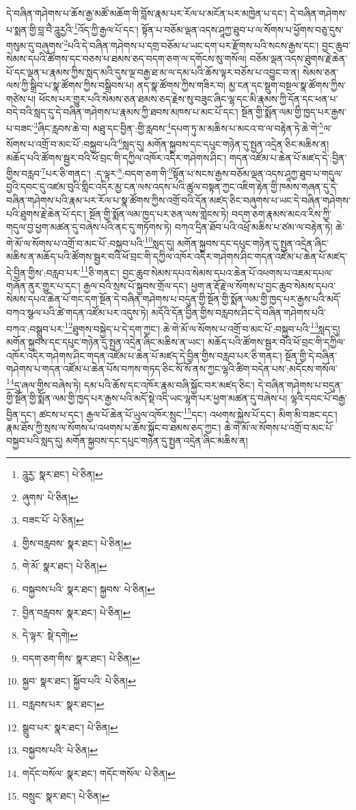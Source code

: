 དེ་བཞིན་གཤེགས་པ་ཆོས་རྒྱ་མཚོ་མཆོག་གི་བློས་རྣམ་པར་རོལ་པ་མངོན་པར་མཁྱེན་པ་དང་། དེ་བཞིན་གཤེགས་པ་སྨན་གྱི་བླ་བཻ་ཌཱུརྱའི་\footnote{ཌཱུརྱ་  སྣར་ཐང་།  པེ་ཅིན། }འོད་ཀྱི་རྒྱལ་པོ་དང་། སྟོན་པ་བཅོམ་ལྡན་འདས་ཤཱཀྱ་ཐུབ་པ་ལ་སོགས་པ་ཕྱོགས་བཅུ་དུས་གསུམ་དུ་བཞུགས་\footnote{ཞུགས་  པེ་ཅིན། }པའི་དེ་བཞིན་གཤེགས་པ་དགྲ་བཅོམ་པ་ཡང་དག་པར་རྫོགས་པའི་སངས་རྒྱས་དང་། བྱང་ཆུབ་སེམས་དཔའི་ཚོགས་དང་བཅས་པ་ཐམས་ཅད་བདག་ཅག་ལ་དགོངས་སུ་གསོལ། བཅོམ་ལྡན་འདས་ཐུགས་རྗེ་ཆེན་པོ་དང་ལྡན་པ་རྣམས་ཀྱིས་སླད་མའི་དུས་ལྔ་བརྒྱ་ཐ་མ་ལ་དམ་པའི་ཆོས་ལྟར་བཅོས་པ་འབྱུང་བ་ན། སེམས་ཅན་ལས་ཀྱི་སྒྲིབ་པ་སྣ་ཚོགས་ཀྱིས་བསྒྲིབས་པ། ནད་སྣ་ཚོགས་ཀྱིས་གཟིར་བ། མྱ་ངན་དང་སྡུག་བསྔལ་སྣ་ཚོགས་ཀྱིས་གཙེས་པ། ཕོངས་པར་གྱུར་པའི་སེམས་ཅན་ཐམས་ཅད་རྗེས་སུ་བཟུང་ཞིང་ལྷ་དང་མི་རྣམས་ཀྱི་དོན་དང་ཕན་པ་བདེ་བའི་སླད་དུ་དེ་བཞིན་གཤེགས་པ་རྣམས་ཀྱི་ཐབས་མཁས་པ་མང་པོ་དང་། སྔོན་གྱི་སྨོན་ལམ་གྱི་ཁྱད་པར་རྒྱས་པ་བཟང་\footnote{བཟང་པོ་  པེ་ཅིན། }ཞིང་རླབས་ཆེ་བ། མཐུ་དང་བྱིན་:གྱི་རླབས་\footnote{གྱིས་བརླབས་  སྣར་ཐང་།  པེ་ཅིན། }དཔག་ཏུ་མ་མཆིས་པ་མངའ་བ་ལ་བརྟེན་ཏེ་ཆེ་གེ་\footnote{གེ་མོ་  སྣར་ཐང་།  པེ་ཅིན། }ལ་སོགས་པ་འགྲོ་བ་མང་པོ་:བསྐྱབ་པའི་\footnote{བསྐྱབས་པའི་  སྣར་ཐང་། སྐྱབས་  པེ་ཅིན། }སླད་དུ། མགོན་སྐྱབས་དང་དཔུང་གཉེན་དུ་སྤྱན་འདྲེན་ཅིང་མཆིས་ན། མཆོད་པའི་ཚོགས་སྦྱར་བའི་ཕོ་བྲང་གི་དཀྱིལ་འཁོར་འདིར་གཤེགས་ཤིང་། གདན་འཛོམ་པ་ཆེན་པོ་མཛད་དེ་:བྱིན་གྱིས་བརླབ་\footnote{བྱིན་བརླབས་  སྣར་ཐང་།  པེ་ཅིན། }པར་ཅི་གནང་། :ད་ལྟར་\footnote{དེ་ལྟར་  སྡེ་དགེ། }:བདག་ཅག་གི་\footnote{བདག་ཅག་གིས་  སྣར་ཐང་།  པེ་ཅིན། }སྟོན་པ་སངས་རྒྱས་བཅོམ་ལྡན་འདས་ཤཱཀྱ་ཐུབ་པ་གདུལ་བྱའི་དབང་དུ་འཛམ་བུའི་གླིང་འདིར་མྱ་ངན་ལས་འདས་པའི་ཚུལ་བསྟན་ཀྱང་འཇིག་རྟེན་གྱི་ཁམས་གཞན་དུ་དེ་བཞིན་གཤེགས་པའི་རྣམ་པར་རོལ་པ་སྣ་ཚོགས་ཀྱིས་འགྲོ་བའི་དོན་མཛད་ཅིང་བཞུགས་པ་ཡང་དེ་བཞིན་གཤེགས་པའི་ཐུགས་རྗེ་ཆེན་པོ་དང་། སྔོན་གྱི་སྨོན་ལམ་ཁྱད་པར་ཅན་ལས་གླེངས་ཏེ། བདག་ཅག་རྣམས་མངའ་རིས་ཀྱི་གདུལ་བྱ་ཕྱག་མཚན་དུ་བཞེས་པའི་ནང་དུ་གཏོགས་ཏེ། བཀའ་དྲིན་ཐོབ་པའི་འཕྲོ་མཆིས་པ་ཙམ་ལ་བརྟེན་ཏེ། ཆེ་གེ་མོ་ལ་སོགས་པ་འགྲོ་བ་མང་པོ་:བསྐྱབ་པའི་\footnote{སྐྱབ་  སྣར་ཐང་། སྐྱོབ་པའི་  པེ་ཅིན། }སླད་དུ། མགོན་སྐྱབས་དང་དཔུང་གཉེན་དུ་སྤྱན་འདྲེན་ཞིང་མཆིས་ན་མཆོད་པའི་ཚོགས་སྦྱར་བའི་ཕོ་བྲང་གི་དཀྱིལ་འཁོར་འདིར་གཤེགས་ཤིང་གདན་འཛོམ་པ་ཆེན་པོ་མཛད་དེ་བྱིན་གྱིས་:བརླབ་པར་\footnote{བརླབས་པར་  སྣར་ཐང་། }ཅི་གནང་། བྱང་ཆུབ་སེམས་དཔའ་སེམས་དཔའ་ཆེན་པོ་འཕགས་པ་འཇམ་དཔལ་གཞོན་ནུར་གྱུར་པ་དང་། རྒྱལ་བའི་སྲས་པོ་སྐྱབས་གྲོལ་དང་། ཕྱག་ན་རྡོ་རྗེ་ལ་སོགས་པ་བྱང་ཆུབ་སེམས་དཔའ་སེམས་དཔའ་ཆེན་པོ་གང་དག་སྔོན་དེ་བཞིན་གཤེགས་པ་བདུན་གྱི་སྔོན་གྱི་སྨོན་ལམ་གྱི་ཁྱད་པར་རྒྱས་པའི་མདོ་བཀའ་སྩལ་པའི་ཚེ་གདན་འཛོམ་པར་འདུས་ཏེ། མདོའི་དོན་བྱིན་གྱིས་བརླབས་ཤིང་དེ་བཞིན་གཤེགས་པའི་བཀའ་:བསྒྲུབ་པར་\footnote{སྒྲུབ་པར་  སྣར་ཐང་།  པེ་ཅིན། }ཐུགས་བསྐྱེད་པ་དེ་དག་ཀྱང་། ཆེ་གེ་མོ་ལ་སོགས་པ་འགྲོ་བ་མང་པོ་:བསྐྱབ་པའི་\footnote{བསྐྱབས་པའི་  པེ་ཅིན། }སླད་དུ། མགོན་སྐྱབས་དང་དཔུང་གཉེན་དུ་སྤྱན་འདྲེན་ཞིང་མཆིས་ན་ཡང་། མཆོད་པའི་ཚོགས་སྦྱར་བའི་ཕོ་བྲང་གི་དཀྱིལ་འཁོར་འདིར་གཤེགས་ཤིང་གདན་འཛོམ་པ་ཆེན་པོ་མཛད་དེ་བྱིན་གྱིས་བརླབ་པར་ཅི་གནང་། སྔོན་གྱི་དེ་བཞིན་གཤེགས་པ་གདན་འཛོམ་པ་ཆེན་པོས་བཀས་གཏད་ཅིང་སོ་སོ་ནས་ཀྱང་ལྷའི་ཚིག་བདེན་པས་:མདོངས་གསོལ་\footnote{གདོང་བསོལ་  སྣར་ཐང་། གདོང་གསོལ་  པེ་ཅིན། }དུ་ཞལ་གྱིས་བཞེས་ཏེ། དམ་པའི་ཆོས་དང་འཁོར་རྣམ་བཞི་སྐྱོང་བར་མཛད་ཅིང་། དེ་བཞིན་གཤེགས་པ་བདུན་གྱི་སྔོན་གྱི་སྨོན་ལམ་གྱི་ཁྱད་པར་རྒྱས་པའི་མདོ་སྡེ་འདི་ཡང་ལྷག་པར་ཕྱག་མཚན་དུ་བཞེས་པ། ལྷའི་དབང་པོ་བརྒྱ་བྱིན་དང་། ཚངས་པ་དང་། རྒྱལ་པོ་ཆེན་པོ་ཡུལ་འཁོར་སྲུང་\footnote{བསྲུང་  སྣར་ཐང་།  པེ་ཅིན། }དང་། འཕགས་སྐྱེས་པོ་དང་། མིག་མི་བཟང་དང་། རྣམ་ཐོས་ཀྱི་སྲས་ལ་སོགས་པ་འཕགས་པ་ཆོས་སྐྱོང་བ་ཐམས་ཅད་ཀྱང་། ཆེ་གེ་མོ་ལ་སོགས་པ་འགྲོ་བ་མང་པོ་བསྐྱབ་པའི་སླད་དུ། མགོན་སྐྱབས་དང་དཔུང་གཉེན་དུ་སྤྱན་འདྲེན་ཞིང་མཆིས་ན། 